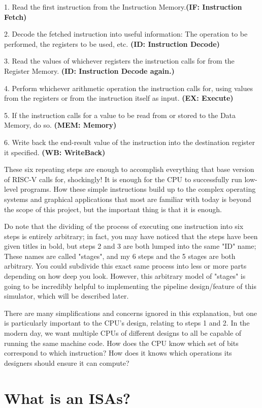 \documentclass[12pt,twoside]{reedthesis}
\begin{document}
1. Read the first instruction from the Instruction Memory.\textbf{(IF: Instruction Fetch)}

2. Decode the fetched instruction into useful information: The operation to be performed, the registers to be used, etc. \textbf{(ID: Instruction Decode)}

3. Read the values of whichever registers the instruction calls for from the Register Memory. \textbf{(ID: Instruction Decode again.)}

4. Perform whichever arithmetic operation the instruction calls for, using values from the registers or from the instruction itself as input. \textbf{(EX: Execute)}

5. If the instruction calls for a value to be read from or stored to the Data Memory, do so. \textbf{(MEM: Memory)}

6. Write back the end-result value of the instruction into the destination register it specified. \textbf{(WB: WriteBack)}

These six repeating steps are enough to accomplish everything that base version of RISC-V calls for, shockingly! It is enough for the CPU to successfully run low-level programs. How these simple instructions build up to the complex operating systems and graphical applications that most are familiar with today is beyond the scope of this project, but the important thing is that it is enough.

Do note that the dividing of the process of executing one instruction into six steps is entirely arbitrary; in fact, you may have noticed that the steps have been given titles in bold, but steps 2 and 3 are both lumped into the same "ID" name; These names are called "stages", and my 6 steps and the 5 stages are both arbitrary. You could subdivide this exact same process into less or more parts depending on how deep you look. However, this arbitrary model of "stages" is going to be incredibly helpful to implementing the pipeline design/feature of this simulator, which will be described later.

There are many simplifications and concerns ignored in this explanation, but one is particularly important to the CPU's design, relating to steps 1 and 2. In the modern day, we want multiple CPUs of different designs to all be capable of running the same machine code. How does the CPU know which set of bits correspond to which instruction? How does it knows which operations its designers should ensure it can compute?

\section{What is an ISAs?}
\end{document}
